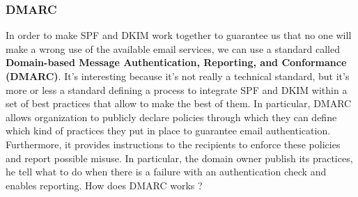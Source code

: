 \subsubsection{DMARC}
In order to make SPF and DKIM work together to guarantee us that no one will make a wrong use of the available email services, we can use a standard called \textbf{Domain-based Message Authentication, Reporting, and Conformance (DMARC)}. It's interesting because it's not really a technical standard, but it's more or less a standard defining a process to integrate SPF and DKIM within a set of best practices that allow to make the best of them. In particular, DMARC allows organization to publicly declare policies through which they can define which kind of practices they put in place to guarantee email authentication. Furthermore, it provides instructions to the recipients to enforce these policies and report possible misuse. In particular, the domain owner publish its practices, he tell what to do when there is a failure with an authentication check and enables reporting. How does DMARC works ?
